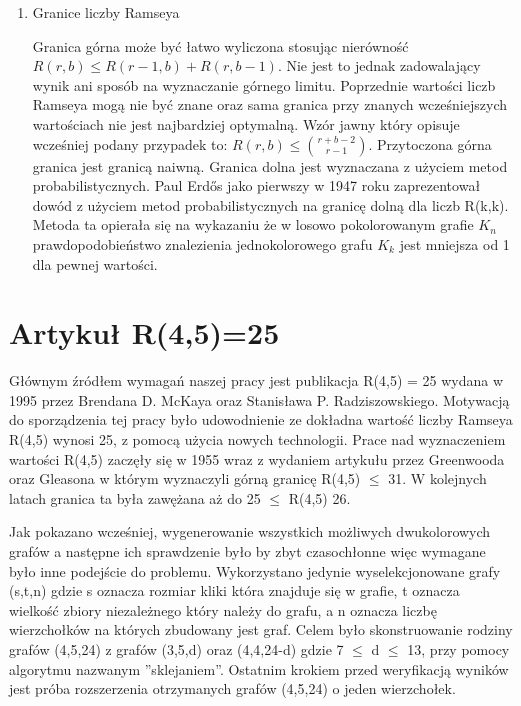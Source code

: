\documentclass[11pt]{article}
\begin{document}
\begin{enumerate}
\item Granice liczby Ramseya \hfill \par

Granica górna może być łatwo wyliczona stosując nierówność $R(r,b) \le R(r-1,b)+R(r,b-1)$. Nie jest to jednak zadowalający wynik ani sposób na wyznaczanie górnego limitu. Poprzednie wartości liczb Ramseya mogą nie być znane oraz sama granica przy znanych wcześniejszych wartościach nie jest najbardziej optymalną. Wzór jawny który opisuje wcześniej podany przypadek to: $R(r,b) \le {r+b-2\choose r-1}$. Przytoczona górna granica jest granicą naiwną. Granica dolna jest wyznaczana z użyciem metod probabilistycznych. Paul Erdős jako pierwszy w 1947 roku zaprezentował dowód z użyciem metod probabilistycznych na granicę dolną dla liczb R(k,k). Metoda ta opierała się na wykazaniu że w losowo pokolorowanym grafie $\mathit{K}_{n}$ prawdopodobieństwo znalezienia jednokolorowego grafu $\mathit{K}_{k}$ jest mniejsza od 1 dla pewnej wartości.

\end{enumerate}

\section{Artykuł R(4,5)=25}


Głównym źródłem wymagań naszej pracy jest publikacja R(4,5) = 25 wydana w 1995 przez Brendana D. McKaya oraz Stanisława P. Radziszowskiego. Motywacją do sporządzenia tej pracy było udowodnienie ze dokładna wartość liczby Ramseya R(4,5) wynosi 25, z pomocą użycia nowych technologii. Prace nad wyznaczeniem wartości R(4,5) zaczęły się w 1955 wraz z wydaniem artykułu przez Greenwooda oraz Gleasona w którym wyznaczyli górną granicę R(4,5) $\leq$ 31. W kolejnych latach granica ta była zawężana aż do 25 $\leq$ R(4,5)  26.\par
Jak pokazano wcześniej, wygenerowanie wszystkich możliwych dwukolorowych grafów a następne ich sprawdzenie było by zbyt czasochłonne więc wymagane było inne podejście do problemu. Wykorzystano jedynie wyselekcjonowane grafy (s,t,n) gdzie s oznacza rozmiar kliki która znajduje się w grafie, t oznacza wielkość zbiory niezależnego który należy do grafu, a n oznacza liczbę wierzchołków na których zbudowany jest graf. Celem było skonstruowanie rodziny grafów (4,5,24) z grafów (3,5,d) oraz (4,4,24-d) gdzie 7 $\leq$ d $\leq$ 13, przy pomocy algorytmu nazwanym ''sklejaniem''. Ostatnim krokiem przed weryfikacją wyników jest próba rozszerzenia otrzymanych grafów (4,5,24) o jeden wierzchołek.
\end{document}
